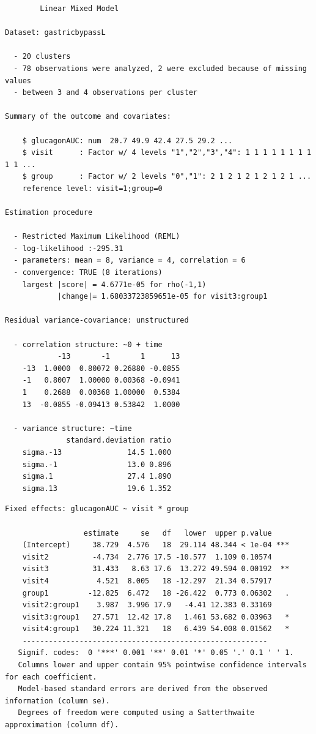 \documentclass[12pt]{article}
\begin{document}
\label{}
\begin{verbatim}
		Linear Mixed Model 
 
Dataset: gastricbypassL 

  - 20 clusters 
  - 78 observations were analyzed, 2 were excluded because of missing values 
  - between 3 and 4 observations per cluster 

Summary of the outcome and covariates: 

    $ glucagonAUC: num  20.7 49.9 42.4 27.5 29.2 ...
    $ visit      : Factor w/ 4 levels "1","2","3","4": 1 1 1 1 1 1 1 1 1 1 ...
    $ group      : Factor w/ 2 levels "0","1": 2 1 2 1 2 1 2 1 2 1 ...
    reference level: visit=1;group=0 

Estimation procedure 

  - Restricted Maximum Likelihood (REML) 
  - log-likelihood :-295.31
  - parameters: mean = 8, variance = 4, correlation = 6
  - convergence: TRUE (8 iterations) 
    largest |score| = 4.6771e-05 for rho(-1,1)
            |change|= 1.68033723859651e-05 for visit3:group1
 
Residual variance-covariance: unstructured 

  - correlation structure: ~0 + time 
            -13       -1       1      13
    -13  1.0000  0.80072 0.26880 -0.0855
    -1   0.8007  1.00000 0.00368 -0.0941
    1    0.2688  0.00368 1.00000  0.5384
    13  -0.0855 -0.09413 0.53842  1.0000

  - variance structure: ~time 
              standard.deviation ratio
    sigma.-13               14.5 1.000
    sigma.-1                13.0 0.896
    sigma.1                 27.4 1.890
    sigma.13                19.6 1.352
\end{verbatim}

\clearpage

\label{}
\begin{verbatim}
Fixed effects: glucagonAUC ~ visit * group 
 
                  estimate     se   df   lower  upper p.value    
    (Intercept)     38.729  4.576   18  29.114 48.344 < 1e-04 ***
    visit2          -4.734  2.776 17.5 -10.577  1.109 0.10574    
    visit3          31.433   8.63 17.6  13.272 49.594 0.00192  **
    visit4           4.521  8.005   18 -12.297  21.34 0.57917    
    group1         -12.825  6.472   18 -26.422  0.773 0.06302   .
    visit2:group1    3.987  3.996 17.9   -4.41 12.383 0.33169    
    visit3:group1   27.571  12.42 17.8   1.461 53.682 0.03963   *
    visit4:group1   30.224 11.321   18   6.439 54.008 0.01562   *
    -------------------------------------------------------- 
   Signif. codes:  0 '***' 0.001 '**' 0.01 '*' 0.05 '.' 0.1 ' ' 1.
   Columns lower and upper contain 95% pointwise confidence intervals for each coefficient.
   Model-based standard errors are derived from the observed information (column se). 
   Degrees of freedom were computed using a Satterthwaite approximation (column df).
\end{verbatim}
\end{document}
